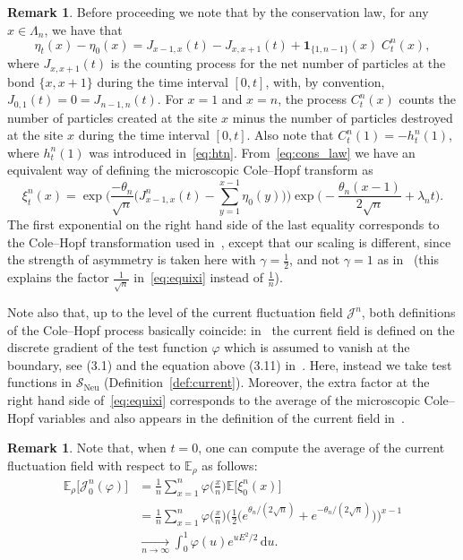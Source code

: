\documentclass[10pt]{amsart}
\theoremstyle{definition}\newtheorem{defi}[theo]{Definition}\newtheorem{rema}[theo]{Remark}\newtheorem{exam}[theo]{Example}\newtheorem{exem}[theo]{Example}\newtheorem{nota}[theo]{Notation}
\DeclareMathOperator{\Neu}{Neu}
\newcommand{\bb}[1]{{\mathbb #1}}
\newcommand{\mc}[1]{{\mathcal #1}}
\renewcommand{\mc}[1]{{\mathcal #1}}
\newcommand{\SN}{\ensuremath{\mc S_{\Neu}}}
\newcommand*{\dd}{\mathrm{d}}
\newcommand*{\du}{\dd u}
\renewcommand{\tfrac}{\frac}
\begin{document}
\begin{rema}
Before proceeding we note that by the conservation law, for any $x\in\Lambda_n$, we have that
\begin{equation}\label{eq:cons_law}
\eta_{t}(x)-\eta_0(x)=J_{x-1,x}(t)-J_{x,x+1}(t)+ \mathbf{1}_{\{1,n-1\}}(x)\;C_t^n(x),
\end{equation}
where $J_{x,x+1}(t)$ is the counting process for the net number of particles at the bond $\{x,x+1\}$ during the time interval $[0,t]$, with, by convention, $J_{0,1}(t)=0=J_{n-1,n}(t)$. For $x=1$ and $x=n$, the process $C_t^n(x)$ counts the number of particles created at the site $x$ minus the number of particles destroyed at the site $x$ during the time interval $[0,t]$. Also note that $C^n_t(1)=-h_t^n(1)$, where $h_t^n(1)$ was introduced in~\eqref{eq:htn}. From~\eqref{eq:cons_law} we have an equivalent way of defining the microscopic Cole--Hopf transform as
\begin{equation}\label{eq:equixi}
\xi_t^n(x) =\exp \bigg(\frac{-\theta_n}{\sqrt n} \bigg(J_{x-1,x}^n(t)-\sum_{y=1}^{x-1} \eta_{0}(y)\bigg)\bigg)\exp\bigg(-\frac{\theta_n(x-1)}{2\sqrt n}+\lambda_n t\bigg).
\end{equation}
The first exponential on the right hand side of the last equality corresponds to the Cole--Hopf transformation used in~\cite{GLM}, except that our scaling is different, since the strength of asymmetry is taken here with $\gamma=\frac12$, and not $\gamma=1$ as in~\cite{GLM} (this explains the factor $\frac{1}{\sqrt n}$ in~\eqref{eq:equixi} instead of $\frac1n$).

Note also that, up to the level of the current fluctuation field $\mc J^n$, both definitions of the Cole--Hopf process basically coincide: in~\cite{GLM} the current field is defined on the discrete gradient of the test function $\varphi$ which is assumed to vanish at the boundary, see (3.1) and the equation above (3.11) in~\cite{GLM}. Here, instead we take test functions in $\SN$ (Definition~\ref{def:current}). Moreover, the extra factor at the right hand side of~\eqref{eq:equixi} corresponds to the average of the microscopic Cole--Hopf variables and also appears in the definition of the current field in~\cite[formula above (3.11)]{GLM}.
\end{rema}



\begin{rema}
Note that, when $t=0$, one can compute the average of the current fluctuation field with respect to $\bb E_\rho$ as follows:
\begin{align*}
\bb E_\rho\big[\mc J_0^n(\varphi) \big]& = \frac{1}{n} \sum_{x=1}^n \varphi\Big(\tfrac x n\Big) \bb E\big[\xi_0^n(x)\big] \\
& = \frac{1}{n}\sum_{x=1}^n \varphi\Big(\tfrac x n\Big) \Big(\tfrac12\big(e^{\theta_n/(2\sqrt n)}+e^{-\theta_n/(2\sqrt n)}\Big)\Big)^{x-1}\\
& \xrightarrow[n\to\infty]{} \int_0^1 \varphi(u) e^{u E^2/2} \,\du.
\end{align*}
\end{rema}
\end{document}
